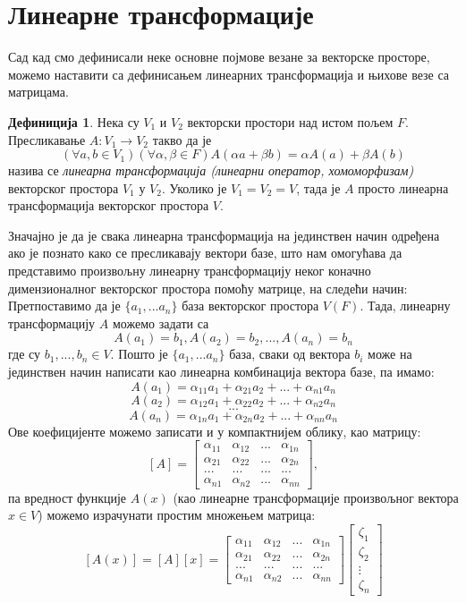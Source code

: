 \documentclass{report}
\theoremstyle{plain}
\theoremstyle{definition}
\newtheorem*{defn}{Дефиниција}
\begin{document}
\section{Линеарне трансформације}
Сад кад смо дефинисали неке основне појмове везане за векторске просторе, можемо наставити са дефинисањем линеарних трансформација и њихове везе са матрицама.
\begin{defn}
Нека су $V_1$ и $V_2$ векторски простори над истом пољем $F$. Пресликавање $A: V_1\to V_2$ такво да је
$$(\forall a, b\in V_1)(\forall \alpha, \beta \in F) A(\alpha a+ \beta b) = \alpha A(a) + \beta A(b)$$
назива се \emph{линеарна трансформација (линеарни оператор, хомоморфизам)} векторског простора $V_1$ у $V_2$. Уколико је $V_1 = V_2 = V$, тада је $A$ просто линеарна трансформација векторског простора $V$.
\end{defn}
Значајно је да је свака линеарна трансформација на јединствен начин одређена ако је познато како се пресликавају вектори базе, што нам омогућава да представимо произвољну линеарну трансформацију неког коначно димензионалног векторског простора помоћу матрице, на следећи начин:\\
Претпоставимо да је $\{a_1, ...a_n\}$ база векторског простора $V(F)$. Тада, линеарну трансформацију $A$ можемо задати са
$$A(a_1) = b_1, A(a_2) = b_2, ..., A(a_n) = b_n$$
где су $b_1, ..., b_n\in V$. Пошто је $\{a_1, ...a_n\}$ база, сваки од вектора $b_i$ може на јединствен начин написати као линеарна комбинација вектора базе, па имамо:
$$A(a_1) = \alpha_{11}a_1 + \alpha_{21}a_2 + ... + \alpha_{n1}a_n$$
$$A(a_2) = \alpha_{12}a_1 + \alpha_{22}a_2 + ... + \alpha_{n2}a_n$$
$$...$$
$$A(a_n) = \alpha_{1n}a_1 + \alpha_{2n}a_2 + ... + \alpha_{nn}a_n$$
Ове коефицијенте можемо записати и у компактнијем облику, као матрицу:
$$[A] = \begin{bmatrix}
    \alpha_{11} & \alpha_{12} & ... & \alpha_{1n} \\
    \alpha_{21} & \alpha_{22} & ... & \alpha_{2n} \\
    ... & ... & ... & ... \\
    \alpha_{n1} & \alpha_{n2} & ... & \alpha_{nn}
  \end{bmatrix},$$
па вредност функције $A(x)$ (као линеарне трансформације произвољног вектора $x\in V$) можемо израчунати простим множењем матрица:
$$[A(x)] = [A][x] = \begin{bmatrix}
            \alpha_{11} & \alpha_{12} & ... & \alpha_{1n} \\
            \alpha_{21} & \alpha_{22} & ... & \alpha_{2n} \\
            ... & ... & ... & ... \\
            \alpha_{n1} & \alpha_{n2} & ... & \alpha_{nn}
           \end{bmatrix}
           \begin{bmatrix}
           \zeta_1\\
           \zeta_2\\
           \vdots \\
           \zeta_n
           \end{bmatrix}
$$
\end{document}
